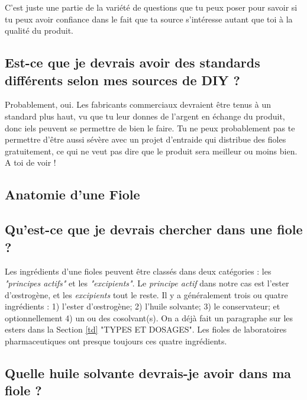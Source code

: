 \documentclass{article}
\begin{document}
C'est juste une partie de la variété de questions que tu peux poser pour savoir si tu peux avoir confiance dans le fait que ta source s'intéresse autant que toi à la qualité du produit.

\subsection{Est-ce que je devrais avoir des standards différents selon mes sources de DIY ?}

Probablement, oui. Les fabricants commerciaux devraient être tenus à un standard plus haut, vu que tu leur donnes de l'argent en échange du produit, donc iels peuvent se permettre de bien le faire. Tu ne peux probablement pas te permettre d'être aussi sévère avec un projet d'entraide qui distribue des fioles gratuitement, ce qui ne veut pas dire que le produit sera meilleur ou moins bien. A toi de voir ! 

\subsection*{Anatomie d'une Fiole}

\subsection{Qu'est-ce que je devrais chercher dans une fiole ?}

Les ingrédients d'une fioles peuvent être classés dans deux catégories : les \textit{"principes actifs"} et les \textit{"excipients"}. Le \textit{principe actif} dans notre cas est l'ester d'œstrogène, et les \textit{excipients} tout le reste. Il y a généralement trois ou quatre ingrédients : 1) l'ester d'œstrogène; 2) l'huile solvante; 3) le conservateur; et optionnellement 4) un ou des cosolvant(s). On a déjà fait un paragraphe sur les esters dans la Section \ref{td} "TYPES ET DOSAGES". Les fioles de laboratoires pharmaceutiques ont presque toujours ces quatre ingrédients.

\subsection{Quelle huile solvante devrais-je avoir dans ma fiole ?}\label{6-16}
\end{document}
